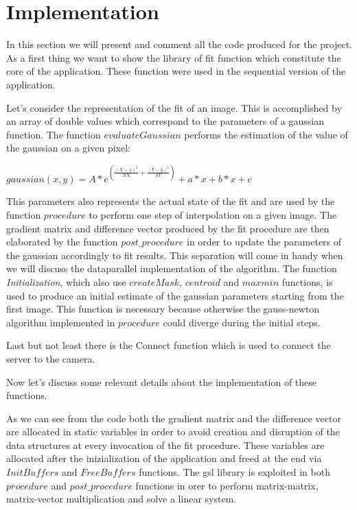 \section{Implementation}

In this section we will present and comment all the code produced for the project.
As a first thing we want to show the library of fit function which constitute the core of the application.
These function were used in the sequential version of the application.



Let's consider the representation of the fit of an image.
This is accomplished by an array of double values which correspond to the parameters of a gaussian function.
The function $evaluateGaussian$ performs the estimation of the value of the gaussian on a given pixel:
\begin{center}
	$gaussian(x,y) = A * e^{( \frac{(X-x)^2}{SX} + \frac{(Y-y)^2}{SY} )} +a*x +b*x +c$
\end{center} 
This parameters also represents the actual state of the fit and are used by the function $procedure$ to perform one step of interpolation on a given image.
The gradient matrix and difference vector produced by the fit procedure are then elaborated by the function $post\_procedure$ in order to update the parameters of the gaussian accordingly to fit results.
This separation will come in handy when we will discuss the dataparallel implementation of the algorithm.
The function \textit{Initialization}, which also use $createMask$, $centroid$ and $maxmin$ functions, is used to produce an initial estimate of the gaussian parameters starting from the first image.
This function is necessary because otherwise the gauss-newton algorithm implemented in $procedure$ could diverge during the initial steps.

Last but not least there is the Connect function which is used to connect the server to the camera.

Now let's discuss some relevant details about the implementation of these functions.



As we can see from the code both the gradient matrix and the difference vector are allocated in static variables in order to avoid creation and disruption of the data structures at every invocation of the fit procedure. 
These variables are allocated after the inizialization of the application and freed at the end via $InitBuffers$ and $FreeBuffers$ functions.
The gsl library is exploited in both $procedure$ and $post\_procedure$ functions in orer to perform matrix-matrix, matrix-vector multiplication and solve a linear system.

